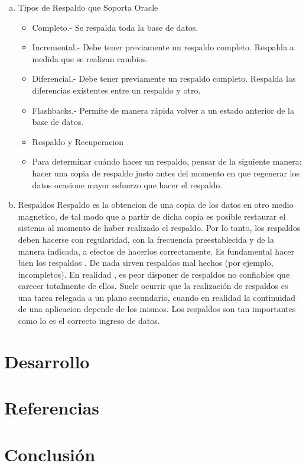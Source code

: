 \documentclass[a4paper,twocolumn,10pt]{article}
\begin{document}
\begin{enumerate}[a)]
    \item Tipos de Respaldo que Soporta Oracle
   \begin{itemize}
          \item Completo.- Se respalda toda la base de datos.
          \item Incremental.- Debe tener previamente un respaldo completo. Respalda a medida que se realizan cambios.
          \item 	Diferencial.- Debe tener previamente un respaldo completo. Respalda las diferencias existentes entre un respaldo y otro.
          \item Flashbacks.- Permite de manera rápida volver a un estado anterior de la base de datos.
          \item Respaldo y Recuperacion
          \item Para determinar cu\'ando hacer un respaldo, pensar de la siguiente manera: hacer una copia de respaldo justo antes del momento en que regenerar los datos ocasione mayor esfuerzo que hacer el respaldo.
       \end{itemize}
   \item Respaldos
      \normalsize Respaldo es la obtencion de una copia de los datos en otro medio magnetico, de tal modo que a partir de dicha copia es posible restaurar el sistema al momento de haber realizado el respaldo. Por lo tanto, los respaldos deben hacerse con regularidad, con la frecuencia preestablecida y de la manera indicada, a efectos de hacerlos correctamente. Es fundamental hacer bien los respaldos . De nada sirven respaldos mal hechos (por ejemplo, incompletos). En realidad , es peor disponer de respaldos no confiables que carecer totalmente de ellos. 
     \normalsize Suele ocurrir que la realizaci\'on de respaldos es una tarea relegada a un plano secundario, cuando en realidad la continuidad de una aplicacion depende de los mismos. Los respaldos son tan importantes como lo es el correcto ingreso de datos.

             

\end{enumerate}



\section{Desarrollo}
\section{Referencias}
\section{Conclusi\'on}
\end{document}
